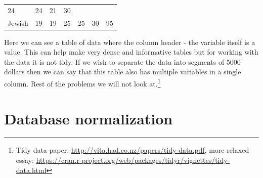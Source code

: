 \documentclass[12pt,oneside]{reedthesis}
\theoremstyle{definition}
\theoremstyle{definition}
\theoremstyle{definition}
\theoremstyle{remark}
\begin{document}
\begin{longtable}[]{@{}lllllll@{}}
\begin{minipage}[t]{0.11\columnwidth}
24\strut
\end{minipage} & \begin{minipage}[t]{0.11\columnwidth}\raggedright\strut
24\strut
\end{minipage} & \begin{minipage}[t]{0.11\columnwidth}\raggedright\strut
21\strut
\end{minipage} & \begin{minipage}[t]{0.11\columnwidth}\raggedright\strut
30\strut
\end{minipage}\tabularnewline
\begin{minipage}[t]{0.16\columnwidth}\raggedright\strut
Jewish\strut
\end{minipage} & \begin{minipage}[t]{0.09\columnwidth}\raggedright\strut
19\strut
\end{minipage} & \begin{minipage}[t]{0.11\columnwidth}\raggedright\strut
19\strut
\end{minipage} & \begin{minipage}[t]{0.11\columnwidth}\raggedright\strut
25\strut
\end{minipage} & \begin{minipage}[t]{0.11\columnwidth}\raggedright\strut
25\strut
\end{minipage} & \begin{minipage}[t]{0.11\columnwidth}\raggedright\strut
30\strut
\end{minipage} & \begin{minipage}[t]{0.11\columnwidth}\raggedright\strut
95\strut
\end{minipage}\tabularnewline
\bottomrule
\end{longtable}
Here we can see a table of data where the column header - the variable
itself is a value. This can help make very dense and informative tables
but for working with the data it is not tidy. If we wish to separate the
data into segments of 5000 dollars then we can say that this table also
has multiple variables in a single column. Rest of the problems we will
not look at.\footnote{Tidy data paper:
  \url{http://vita.had.co.nz/papers/tidy-data.pdf}, more relaxed essay:
  \url{https://cran.r-project.org/web/packages/tidyr/vignettes/tidy-data.html}}

\section{Database normalization}\label{database-normalization}
\end{document}
